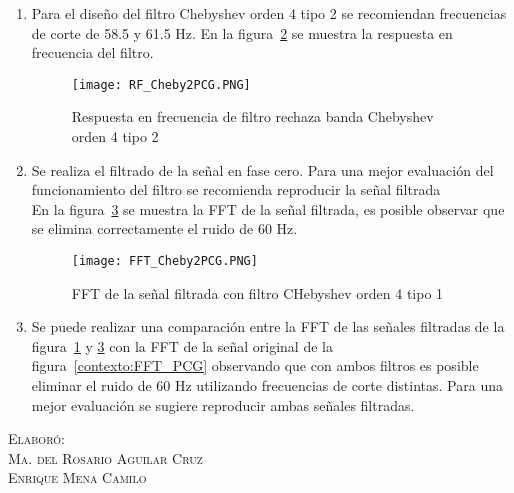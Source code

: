 \documentclass[10pt,letterpaper,spanish,twoside]{report}
\begin{document}
\begin{enumerate}
 \begin{figure}[H]
  \centering
  \texttt{[image: FFT\_Cheby1PCG.PNG]}
  \caption{FFT de la señal filtrada con filtro Chebyshev orden 4 tipo 1}
 \label{contexto:FFT_Cheby1PCG}
 \end{figure}   
 \item Para el diseño del filtro Chebyshev orden 4 tipo 2 se recomiendan frecuencias de corte de 58.5 y 61.5 Hz. En la figura~\ref{contexto:RF_Cheby2PCG} se muestra la respuesta en frecuencia del filtro.
 \begin{figure}[H]
  \centering
  \texttt{[image: RF\_Cheby2PCG.PNG]}
  \caption{Respuesta en frecuencia de filtro rechaza banda Chebyshev orden 4 tipo 2}
  \label{contexto:RF_Cheby2PCG}
 \end{figure}
 \item Se realiza el filtrado de la señal en fase cero. Para una mejor evaluación del funcionamiento del filtro se recomienda reproducir la señal filtrada\\En la figura~\ref{contexto:FFT_Cheby2PCG} se muestra la FFT de la señal filtrada, es posible observar que se elimina correctamente el ruido de 60 Hz.
 \begin{figure}[H]
  \centering
  \texttt{[image: FFT\_Cheby2PCG.PNG]}
  \caption{FFT de la señal filtrada con filtro CHebyshev orden 4 tipo 1}
  \label{contexto:FFT_Cheby2PCG} 
 \end{figure}
 \item Se puede realizar una comparación entre la FFT de las señales filtradas de la figura~\ref{contexto:FFT_Cheby1PCG} y \ref{contexto:FFT_Cheby2PCG} con la FFT de la señal original de la figura~\ref{contexto:FFT_PCG} observando que con ambos filtros es posible eliminar el ruido de 60 Hz utilizando frecuencias de corte distintas. Para una mejor evaluación se sugiere reproducir ambas señales filtradas.
\end{enumerate}

\vfill
\begin{flushright}
\textsc{Elaboró:\\
Ma. del Rosario Aguilar Cruz\\
Enrique Mena Camilo}
\end{flushright}
\end{document}
